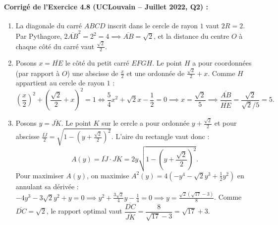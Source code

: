 \paragraph{Corrigé de l'Exercice 4.8 (UCLouvain -- Juillet 2022, Q2) :}
\begin{enumerate}[label=(\alph*)]
    \item La diagonale du carré $ABCD$ inscrit dans le cercle de rayon $1$ vaut $2R = 2$. Par Pythagore, $2\overline{AB}^2 = 2^2 = 4 \implies \overline{AB} = \boxed{\sqrt{2}}$, et la distance du centre $O$ à chaque côté du carré vaut $\frac{\sqrt{2}}{2}$.
    \item Posons $x = \overline{HE}$ le côté du petit carré $EFGH$. Le point $H$ a pour coordonnées (par rapport à $O$) une abscisse de $\frac{x}{2}$ et une ordonnée de $\frac{\sqrt{2}}{2} + x$. Comme $H$ appartient au cercle de rayon $1$ :
    \[
        \left(\frac{x}{2}\right)^2 + \left(\frac{\sqrt{2}}{2} + x\right)^2 = 1 \iff \frac{5}{4}x^2 + \sqrt{2}x - \frac{1}{2} = 0 \implies x = \frac{\sqrt{2}}{5} \implies \boxed{\frac{\overline{AB}}{\overline{HE}} = \frac{\sqrt{2}}{\sqrt{2}/5} = 5}.
    \]
    \item Posons $y = \overline{JK}$. Le point $K$ sur le cercle a pour ordonnée $y + \frac{\sqrt{2}}{2}$ et pour abscisse $\frac{\overline{IJ}}{2} = \sqrt{1 - \left(y + \frac{\sqrt{2}}{2}\right)^2}$. L'aire du rectangle vaut donc :
    \[
        A(y) = \overline{IJ}\cdot\overline{JK} = 2y\sqrt{1 - \left(y + \frac{\sqrt{2}}{2}\right)^2}.
    \]
    Pour maximiser $A(y)$, on maximise $A^2(y) = 4\left(-y^4 - \sqrt{2}y^3 + \frac{1}{2}y^2\right)$ en annulant sa dérivée : $-4y^3 - 3\sqrt{2}y^2 + y = 0 \implies y^2 + \frac{3\sqrt{2}}{4}y - \frac{1}{4} = 0 \implies y = \frac{\sqrt{2}(\sqrt{17}-3)}{8}$. Comme $\overline{DC} = \sqrt{2}$, le rapport optimal vaut $\boxed{\dfrac{\overline{DC}}{\overline{JK}} = \dfrac{8}{\sqrt{17}-3} = \sqrt{17}+3}$.
\end{enumerate}

